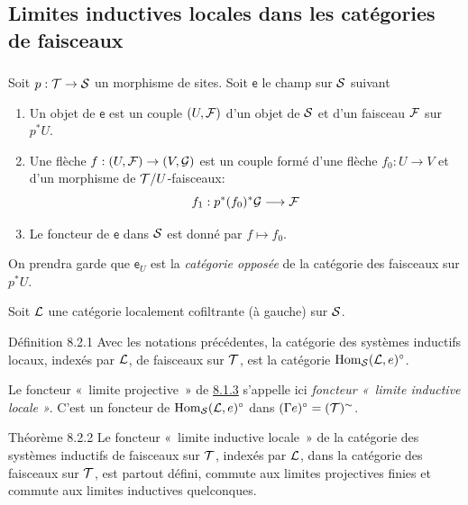 \documentclass[10pt]{../fichiers-configuration-latex/smfart}
\begin{document}
\subsection{Limites inductives locales dans les catégories de
  faisceaux}

\setcounter{subsubsection}{-1}
\subsubsection{}

Soit $p : \Tt \to \Ss$ un morphisme de sites. Soit $\mathsf{e}$
le champ sur ${\mathcal S}$ suivant
\begin{enumerate}
\renewcommand{\theenumi}{\roman {enumi}}
\renewcommand{\labelenumi}{(\theenumi)}
\item Un objet de $\mathsf{e}$ est un couple $(U, {\mathcal F})$ d'un
  objet de ${\mathcal S}$ et d'un faisceau ${\mathcal F}$ sur $p^{\ast}
  U$.

\item Une flèche $f : (U, \Ff) \to (V, \Gg)$ est un couple formé
  d'une flèche $f_{0} : U \to V$ et d'un morphisme de
  ${\mathcal T}/U$-faisceaux:
$$
f_1 : p^{\ast} (f_0)^{\ast} \Gg \to \Ff
$$

\item Le foncteur de $\mathsf{e}$ dans ${\mathcal S}$ est donné par $f \mapsto
  f_0$.
\end{enumerate}

On prendra garde que $\mathsf{e}_U$ est la \emph{catégorie opposée} de
  la catégorie des faisceaux sur $p^{\ast} U$.

Soit ${\mathcal L}$ une catégorie localement cofiltrante (à gauche) sur ${\mathcal S}$.

\begin{enonce*}{Définition 8.2.1}
Avec les notations précédentes, la catégorie des systèmes inductifs
locaux, indexés par ${\mathcal L}$, de faisceaux sur ${\mathcal T}$, est la catégorie
$\operatorname{Hom}_{{\mathcal S}}({\mathcal L}, {e})^{\circ}$.
\end{enonce*}

Le foncteur « limite projective »  de \hyperref[V.def8.1.3]{8.1.3} s'appelle ici \emph{foncteur
« limite inductive locale »}. C'est un foncteur de
$\operatorname{Hom}_{{\mathcal S}}({\mathcal L}, {e})^{\circ}$ dans $(\Gamma
{e})^{\circ} = ({\mathcal T})^{\sim}$.

\begin{enonce*}{Théorème 8.2.2}
Le foncteur « limite inductive locale »  de la catégorie des
systèmes inductifs de faisceaux sur ${\mathcal T}$, indexés par
${\mathcal L}$, dans la catégorie des faisceaux sur ${\mathcal T}$, est
partout défini, commute aux limites projectives finies et commute aux
limites inductives quelconques.
\end{enonce*}
\end{document}
